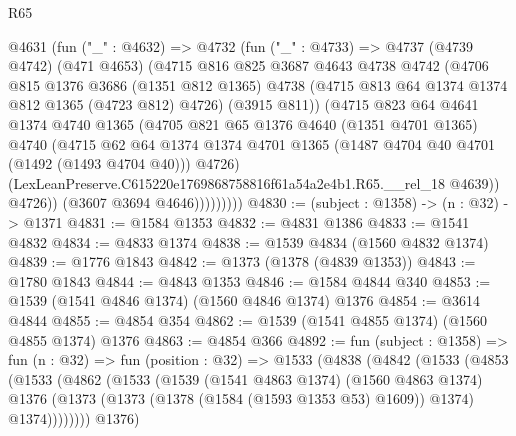\begin{lexlean}{R65}
\begin{coremodule}
              @4631
                (fun ("_" : @4632) =>
                @4732
                  (fun ("_" : @4733) =>
                  @4737
                    (@4739 @4742)
                    (@471 @4653)
                    (@4715
                      @816
                      @825
                      @3687
                      @4643
                      @4738
                      @4742
                      (@4706
                        @815
                        @1376
                        @3686
                        (@1351 @812 @1365)
                        @4738
                        (@4715 @813 @64 @1374 @1374 @812 @1365 (@4723 @812) @4726)
                        (@3915 @811))
                      (@4715
                        @823
                        @64
                        @4641
                        @1374
                        @4740
                        @1365
                        (@4705
                          @821
                          @65
                          @1376
                          @4640
                          (@1351 @4701 @1365)
                          @4740
                          (@4715
                            @62
                            @64
                            @1374
                            @1374
                            @4701
                            @1365
                            (@1487 @4704 @40 @4701 (@1492 (@1493 @4704 @40)))
                            @4726)
                          (LexLeanPreserve.C615220e1769868758816f61a54a2e4b1.R65.__rel_18 @4639))
                        @4726))
                    (@3607 @3694 @4646)))))))))
@4830 := (subject : @1358) -> (n : @32) -> @1371
@4831 := @1584 @1353
@4832 := @4831 @1386
@4833 := @1541 @4832
@4834 := @4833 @1374
@4838 := @1539 @4834 (@1560 @4832 @1374)
@4839 := @1776 @1843
@4842 := @1373 (@1378 (@4839 @1353))
@4843 := @1780 @1843
@4844 := @4843 @1353
@4846 := @1584 @4844 @340
@4853 := @1539 (@1541 @4846 @1374) (@1560 @4846 @1374) @1376
@4854 := @3614 @4844
@4855 := @4854 @354
@4862 := @1539 (@1541 @4855 @1374) (@1560 @4855 @1374) @1376
@4863 := @4854 @366
@4892 := fun (subject : @1358) =>
  fun (n : @32) =>
  fun (position : @32) =>
  @1533
    (@4838
      (@4842
        (@1533
          (@4853
            (@1533
              (@4862
                (@1533
                  (@1539
                    (@1541 @4863 @1374)
                    (@1560 @4863 @1374)
                    @1376
                    (@1373 (@1373 (@1378 (@1584 (@1593 @1353 @53) @1609)) @1374) @1374))))))))
      @1376)

\end{coremodule}
\end{lexlean}
